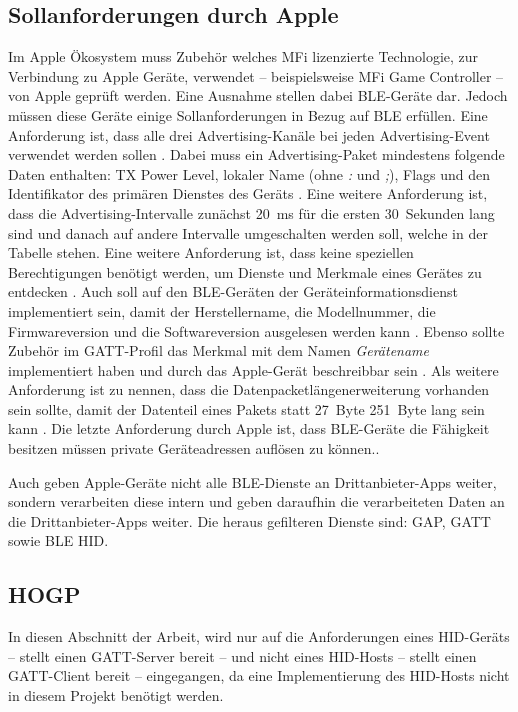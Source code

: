\subsection{Sollanforderungen durch Apple}
Im Apple Ökosystem muss Zubehör welches \ac{MFi} lizenzierte Technologie, zur Verbindung zu Apple Geräte, verwendet -- beispielsweise \ac{MFi} Game Controller -- von Apple geprüft werden. Eine Ausnahme stellen dabei \ac{BLE}-Geräte dar. \cite{appleMfiProgram} Jedoch müssen diese Geräte einige Sollanforderungen in Bezug auf \ac{BLE} erfüllen. Eine Anforderung ist, dass alle drei Advertising-Kanäle bei jeden Advertising-Event verwendet werden sollen \cite[S.~186]{appleDesignGuide}. Dabei muss ein Advertising-Paket mindestens folgende Daten enthalten: TX Power Level, lokaler Name (ohne \textit{:} und \textit{;}), Flags und den Identifikator des primären Dienstes des Geräts \cite[S.~186f.]{appleDesignGuide}. Eine weitere Anforderung ist, dass die Advertising-Intervalle zunächst 20~ms für die ersten 30~Sekunden lang sind und danach auf andere Intervalle umgeschalten werden soll, welche in der Tabelle \cite[S.~187]{appleDesignGuide} stehen. Eine weitere Anforderung ist, dass keine speziellen Berechtigungen benötigt werden, um Dienste und Merkmale eines Gerätes zu entdecken \cite[S.~190]{appleDesignGuide}. Auch soll auf den \ac{BLE}-Geräten der Geräteinformationsdienst implementiert sein, damit der Herstellername, die Modellnummer, die Firmwareversion und die Softwareversion ausgelesen werden kann \cite[S.~191]{appleDesignGuide}. Ebenso sollte Zubehör im \ac{GATT}-Profil das Merkmal mit dem Namen \textit{Gerätename} implementiert haben und durch das Apple-Gerät beschreibbar sein \cite[S.~190]{appleDesignGuide}. Als weitere Anforderung ist zu nennen, dass die Datenpacketlängenerweiterung vorhanden sein sollte, damit der Datenteil eines Pakets statt 27~Byte 251~Byte lang sein kann \cite[S.~189]{appleDesignGuide}. Die letzte Anforderung durch Apple ist, dass \ac{BLE}-Geräte die Fähigkeit besitzen müssen private Geräteadressen auflösen zu können.\cite[S.~189]{appleDesignGuide}.

Auch geben Apple-Geräte nicht alle \ac{BLE}-Dienste an Drittanbieter-Apps weiter, sondern verarbeiten diese intern und geben daraufhin die verarbeiteten Daten an die Drittanbieter-Apps weiter. Die heraus gefilteren Dienste sind: \ac{GAP}, \ac{GATT} sowie \ac{BLE} \ac{HID}. \cite[S.~192]{appleDesignGuide}

\subsection{\acf{HOGP}}
In diesen Abschnitt der Arbeit, wird nur auf die Anforderungen eines \acs{HID}-Geräts -- stellt einen \acs{GATT}-Server bereit \cite[S.~9]{bluetoothHOGP} -- und nicht eines \acs{HID}-Hosts -- stellt einen \acs{GATT}-Client bereit \cite[S.~9]{bluetoothHOGP} -- eingegangen, da eine Implementierung des \acs{HID}-Hosts nicht in diesem Projekt benötigt werden.

